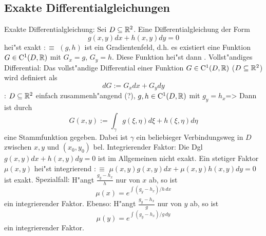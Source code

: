 \subsection{Exakte Differentialgleichungen}
 Exakte Differentialgleichung:{
  Sei $D\subseteq\mathbb R^2$. Eine Differentialgleichung der Form
  \[g(x,y)dx+h(x,y)dy=0
    \]
  hei"st exakt $:\equiv$ $(g,h)$ ist ein Gradientenfeld, d.h. es existiert
  eine Funktion $G\in{\rm C}^1(D,\mathbb R)$ mit $G_x=g$, $G_y=h$.
  Diese Funktion hei"st dann .
  }
 Vollst"andiges Differential:{
  Das vollst"andige Differential einer Funktion $G\in{\rm C}^1(D,\mathbb R)$ 
  ($D\subseteq\mathbb R^2$) wird definiert als
  \[dG:=G_xdx+G_ydy
    \]
  }
\theorem:
  $D\subseteq\mathbb R^2$ einfach zusammenh"angend (?), 
  $g,h\in{\rm C}^1(D,\mathbb R)$ mit $g_y=h_x$=>{
  Dann ist durch
  \[G(x,y):=\int_\gamma g(\xi,\eta)d\xi+h(\xi,\eta) d\eta
    \]
  eine Stammfunktion gegeben. Dabei ist $\gamma$ ein beliebieger 
  Verbindungsweg in $D$ zwischen $x,y$ und $(x_0,y_0)$ bel.
  }
 Integrierender Faktor:{
  Die Dgl $g(x,y)dx+h(x,y)dy=0$ ist im Allgemeinen nicht exakt.
  Ein stetiger Faktor $\mu(x,y)$ hei"st integrierend $:\equiv$
  $\mu(x,y)g(x,y)dx+\mu(x,y)h(x,y)dy=0$ ist exakt.
  }
\remark Spezialfall:{
  H"angt $\frac{g_y-h_x}{h}$ nur von $x$ ab, so ist
  \[\mu(x)=e^{\int (g_y-h_x)/h\,dx}
    \]
  ein integrierender Faktor. Ebenso:
  H"angt $\frac{g_y-h_x}{g}$ nur von $y$ ab, so ist
  \[\mu(y)=e^{\int (g_y-h_x)/g\,dy}
    \]
  ein integrierender Faktor.
  }
